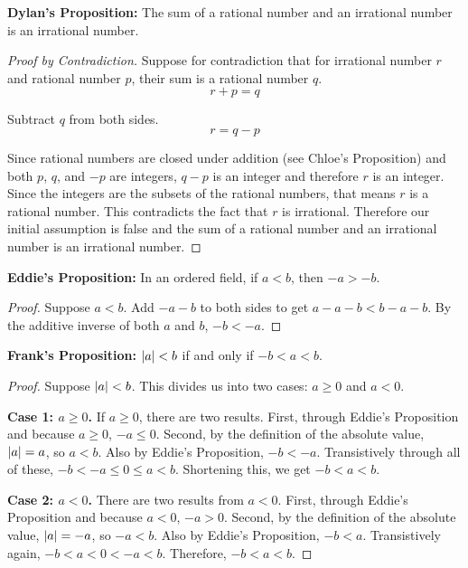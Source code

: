 \documentclass[11pt]{article}
\begin{document}
        \textbf{Dylan's Proposition:}
            The sum of a rational number and an irrational number is an irrational number.
        \begin{proof}[Proof by Contradiction]
            Suppose for contradiction that for irrational number $r$ and rational number $p$, their sum is a rational number $q$.
            \begin{equation}
                r + p = q
            \end{equation}

            Subtract $q$ from both sides.
            \begin{equation}
                r = q - p
            \end{equation}

            Since rational numbers are closed under addition (see Chloe's Proposition) and both $p$, $q$, and $-p$ are integers, $q - p$ is an integer and therefore $r$ is an integer.
            Since the integers are the subsets of the rational numbers, that means $r$ is a rational number.
            This contradicts the fact that $r$ is irrational.
            Therefore our initial assumption is false and the sum of a rational number and an irrational number is an irrational number.
        \end{proof}
        
        \textbf{Eddie's Proposition:}
            In an ordered field, if $a < b$, then $-a > -b$.
        \begin{proof}
            Suppose $a < b$.
            Add $-a - b$ to both sides to get $a - a - b < b - a - b$.
            By the additive inverse of both $a$ and $b$, $-b < -a$.
        \end{proof}
        
        \textbf{Frank's Proposition:}
            $\left| a \right| < b$ if and only if $-b < a < b$.
        \begin{proof}
            Suppose $\left| a \right| < b$.
            This divides us into two cases: $a \geq 0$ and $a < 0$.
            
            \textbf{Case 1: $a \geq 0$.}
                If $a \geq 0$, there are two results.
                First, through Eddie's Proposition and because $a \geq 0$, $-a \leq 0$.
                Second, by the definition of the absolute value, $\left| a \right| = a$, so $a < b$.
                Also by Eddie's Proposition, $-b < -a$.
                Transistively through all of these, $-b < -a \leq 0 \leq a < b$.
                Shortening this, we get $-b < a < b$.

            \textbf{Case 2: $a < 0$.}
                There are two results from $a < 0$.
                First, through Eddie's Proposition and because $a < 0$, $-a > 0$.
                Second, by the definition of the absolute value, $\left| a \right| = -a$, so $-a < b$.
                Also by Eddie's Proposition, $-b < a$.
                Transistively again, $-b < a < 0 < -a < b$.
                Therefore, $-b < a < b$.
        \end{proof}
\end{document}
